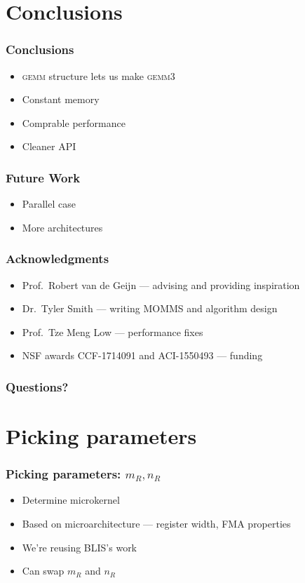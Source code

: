 \documentclass{beamer}
\newcommand*{\gemmt}{{\textsc{gemm3}}}
\newcommand*{\gemm}{{\textsc{gemm}}}
\begin{document}
\section{Conclusions}
\begin{frame}
  \frametitle{Conclusions}
  \begin{itemize}
  \item \gemm{} structure lets us make \gemmt{}
  \item Constant memory
  \item Comprable performance
  \item Cleaner API
  \end{itemize}
\end{frame}

\begin{frame}
  \frametitle{Future Work}
  \begin{itemize}
  \item Parallel case
  \item More architectures
  \end{itemize}
\end{frame}

\begin{frame}
  \frametitle{Acknowledgments}
  \begin{itemize}
  \item Prof.\ Robert van de Geijn --- advising and providing inspiration
  \item Dr.\ Tyler Smith --- writing MOMMS and algorithm design
  \item Prof.\ Tze Meng Low --- performance fixes
  \item NSF awards CCF-1714091 and ACI-1550493 --- funding
  \end{itemize}
\end{frame}

\begin{frame}
  \frametitle{Questions?}
\end{frame}

\section{Picking parameters}
\begin{frame}
  \frametitle{Picking parameters: $m_R, n_R$}
  \begin{itemize}
  \item Determine microkernel
  \item Based on microarchitecture --- register width, FMA properties
  \item We're reusing BLIS's work
  \item Can swap $m_R$ and $n_R$
  \end{itemize}
\end{frame}
\end{document}
